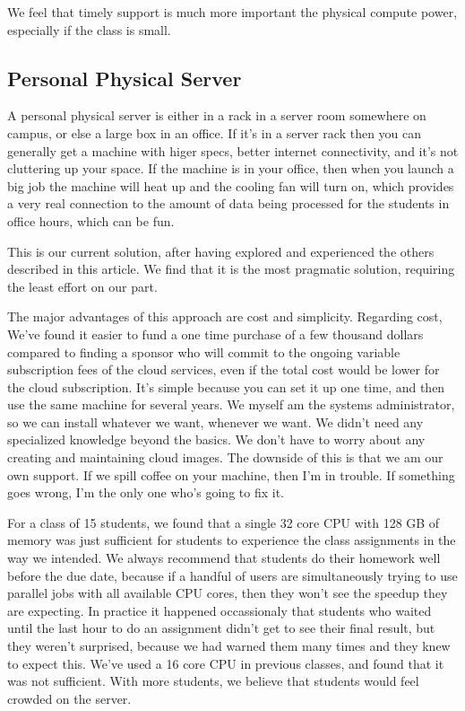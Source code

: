 \documentclass[12pt]{article}
\begin{document}
We feel that timely support is much more important the physical compute power, especially if the class is small.

\subsection{Personal Physical Server}

A personal physical server is either in a rack in a server room somewhere on campus, or else a large box in an office.
If it's in a server rack then you can generally get a machine with higer specs, better internet connectivity, and it's not cluttering up your space.
If the machine is in your office, then when you launch a big job the machine will heat up and the cooling fan will turn on, which provides a very real connection to the amount of data being processed for the students in office hours, which can be fun.

This is our current solution, after having explored and experienced the others described in this article.
We find that it is the most pragmatic solution, requiring the least effort on our part.

The major advantages of this approach are cost and simplicity.
Regarding cost, We've found it easier to fund a one time purchase of a few thousand dollars compared to finding a sponsor who will commit to the ongoing variable subscription fees of the cloud services, even if the total cost would be lower for the cloud subscription.
It's simple because you can set it up one time, and then use the same machine for several years.
We myself am the systems administrator, so we can install whatever we want, whenever we want.
We didn't need any specialized knowledge beyond the basics.
We don't have to worry about any creating and maintaining cloud images.
The downside of this is that we am our own support.
If we spill coffee on your machine, then I'm in trouble.
If something goes wrong, I'm the only one who's going to fix it.

For a class of 15 students, we found that a single 32 core CPU with 128 GB of memory was just sufficient for students to experience the class assignments in the way we intended.
We always recommend that students do their homework well before the due date, because if a handful of users are simultaneously trying to use parallel jobs with all available CPU cores, then they won't see the speedup they are expecting.
In practice it happened occassionaly that students who waited until the last hour to do an assignment didn't get to see their final result, but they weren't surprised, because we had warned them many times and they knew to expect this.
We've used a 16 core CPU in previous classes, and found that it was not sufficient.
With more students, we believe that students would feel crowded on the server.
\end{document}
